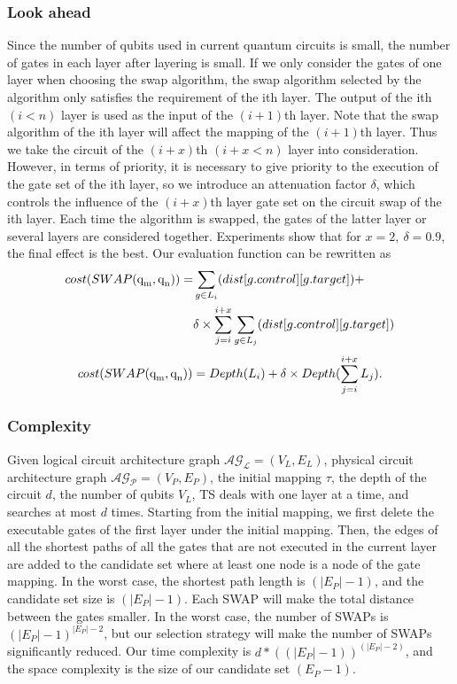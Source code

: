 \documentclass[runningheads]{llncs}
\begin{document}
\subsubsection{Look ahead }
Since the number of qubits used in current quantum circuits is small,  the number of gates in each layer after layering is small. If we only consider the gates of one layer when choosing the swap algorithm, the swap algorithm selected by the algorithm only satisfies the requirement of the ith layer. The output of the ith $(i<n)$ layer is used as the input of the $(i+1)$th layer. Note that the swap algorithm of the ith layer will affect the mapping of the $(i+1)$th layer. Thus we take the circuit of the $(i+x)$th $(i+x< n)$ layer into consideration. However, in terms of priority, it is necessary to give priority to the execution of the gate set of the ith layer, so we introduce an attenuation factor $\delta$, which controls the influence of the $(i+x)$th layer gate set on the circuit swap of the ith layer. Each time the algorithm is swapped, the gates of the latter layer or several layers are considered together. Experiments show that for $x=2,\ \delta=0.9$, the final effect is the best. Our evaluation function can be rewritten as
 \begin{equation}
	 	\begin{aligned}
			cost(SWAP(\textup{q}_\textup{m},\textup{q}_\textup{n}))=&\sum_{g \in L_{i}}(dist[g.control][g.target])+\\
	&\delta \times \sum_{j=i}^{i+x}\sum_{g \in L_{j}}(dist[g.control][g.target])
	\label{cost_num}
	\end{aligned}
 \end{equation}
	\begin{equation}
		cost(SWAP(\textup{q}_\textup{m},\textup{q}_\textup{n}))= Depth(L_{i})+\delta \times Depth(\sum_{j=i}^{i+x}L_{j}).
		\label{cost_depth}
		\end{equation}
\subsubsection{Complexity}
Given logical circuit architecture graph  $\mathcal{AG_{L}}=(V_{L},E_{L})$, physical circuit architecture graph $\mathcal{AG_{P}}=(V_{P},E_{P})$, the initial mapping $\tau$, the depth of the circuit $d$, the number of qubits $V_{L}$, TS deals with one layer at a time, and searches at most $d$ times. Starting from the initial mapping, we first delete the executable gates of the first layer under the initial mapping. Then, the edges of all the shortest paths of all the gates that are not executed in the current layer are added to the candidate set where at least one node is a node of the gate mapping. In the worst case, the shortest path length is $(|E_{P}|-1)$, 
and the candidate set size is $(|E_{P}|-1)$. Each SWAP will make the total distance between the gates smaller. In the worst case, the number of SWAPs is $(|E_{P}|-1)^{|E_{P}|-2}$, but our selection strategy will make the number of SWAPs significantly reduced. Our time complexity is $d*((|E_{P}|-1))^{(|E_{P}|-2)}$, and the space complexity is the size of our candidate set $(E_{P}-1)$.
\end{document}
